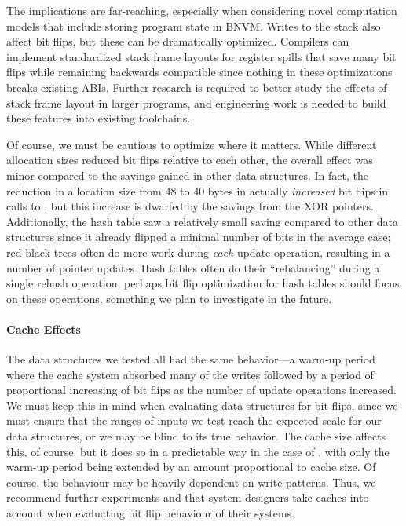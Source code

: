 The implications are far-reaching, especially when considering novel computation
models that include storing program state in BNVM. Writes to the stack also
affect bit flips, but these can be dramatically optimized. Compilers can
implement standardized stack frame layouts for register spills that
save many bit flips while remaining backwards compatible since
nothing in these optimizations breaks existing ABIs. Further research is
required to better study the effects of stack frame layout in larger programs,
and engineering work is needed to build these features into existing toolchains.

Of course, we must be cautious to optimize where it matters. While different
allocation sizes reduced bit flips relative to each other, the overall effect
was minor compared to the savings gained in other data structures. In fact, the
reduction in allocation size from 48 to 40 bytes in \xrbt actually
\textit{increased} bit flips in calls to \malloc, but this increase is
dwarfed by the savings from the XOR pointers. Additionally, the hash table
saw a relatively small saving compared to other data structures since it
already flipped a minimal number of bits in the average case;
red-black trees often do more work during \textit{each} update operation,
resulting in a number of pointer updates. Hash tables often do their
``rebalancing'' during a single rehash operation; perhaps bit flip optimization
for hash tables should focus on these operations, something we plan to
investigate in the future.

\paragraph{Cache Effects}
The data structures we tested all had the same behavior---a warm-up period
where the cache system absorbed many of the writes followed by a period of
proportional increasing of bit flips as the number of update operations
increased. We must
keep this in-mind when evaluating data structures for bit flips, since we must
ensure that the ranges of inputs we test reach the expected scale for
our data structures, or we may be blind to its true behavior.
The cache size affects this, of course, but it does so in a predictable way in
the case of \xrbt, with only the warm-up period being extended by an amount
proportional to cache size. Of course, the behaviour may be heavily dependent on write patterns.
Thus, we recommend further experiments and that system designers take caches into account when
evaluating bit flip behaviour of their systems.

